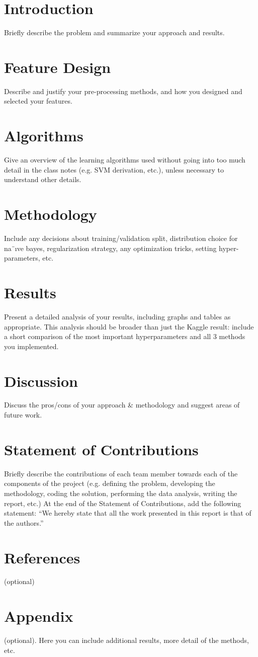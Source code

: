\documentclass[10pt, hidelinks]{article}
\begin{document}
\section*{Introduction}
Briefly describe the problem and summarize your approach and results.

\section*{Feature Design}
Describe and justify your pre-processing methods, and how you designed and selected your features.

\section*{Algorithms}
Give an overview of the learning algorithms used without going into too much detail in the class notes (e.g. SVM derivation, etc.), unless necessary to understand other details.

\section*{Methodology}
Include any decisions about training/validation split, distribution choice for na¨ıve bayes, regularization strategy, any optimization tricks, setting hyper-parameters, etc.

\section*{Results}
Present a detailed analysis of your results, including graphs and tables as appropriate. This analysis should be broader than just the Kaggle result: include a short comparison of the most important hyperparameters and all 3 methods you implemented.

\section*{Discussion}
Discuss the pros/cons of your approach & methodology and suggest areas of future work.

\section*{Statement of Contributions}
Briefly describe the contributions of each team member towards each of the components of the project (e.g. defining the problem, developing the methodology, coding the solution, performing
the data analysis, writing the report, etc.) At the end of the Statement of Contributions, add the following statement: “We hereby state that all the work presented in this report is that of the authors.”

\section*{References}
(optional)

\section*{Appendix}
(optional).
Here you can include additional results, more detail of the methods, etc. 
\end{document}
